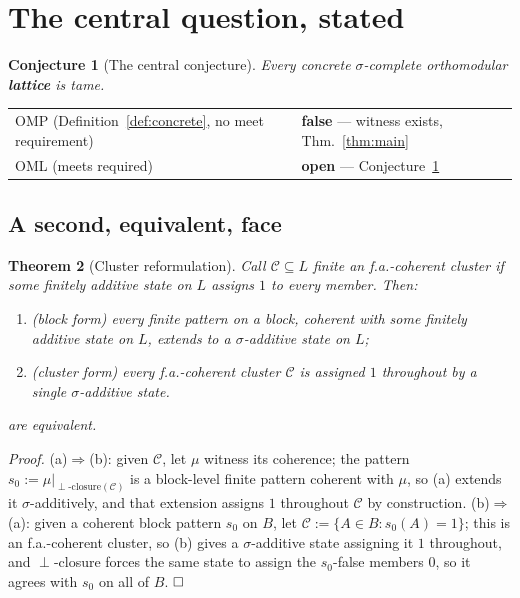 \documentclass[11pt]{article}
\newtheorem{theorem}{Theorem}[section]
\newtheorem{conjecture}[theorem]{Conjecture}
\theoremstyle{remark}
\begin{document}
\section{The central question, stated}

\begin{conjecture}[The central conjecture]
\label{conj:main}
Every concrete $\sigma$-complete orthomodular \textbf{lattice} is tame.
\end{conjecture}

\begin{center}
\begin{tabular}{ll}
\hline
OMP (Definition~\ref{def:concrete}, no meet requirement) & \textbf{false} — witness exists, Thm.~\ref{thm:main}\\
OML (meets required) & \textbf{open} — Conjecture~\ref{conj:main}\\
\hline
\end{tabular}
\end{center}

\subsection{A second, equivalent, face}

\begin{theorem}[Cluster reformulation]
\label{thm:phi-cluster}
Call $\mathcal C\subseteq L$ finite an \emph{f.a.-coherent cluster} if some
finitely additive state on $L$ assigns $1$ to every member. Then:
\begin{enumerate}[label=(\alph*)]
\item (block form) every finite pattern on a block, coherent with some
  finitely additive state on $L$, extends to a $\sigma$-additive state on
  $L$;
\item (cluster form) every f.a.-coherent cluster $\mathcal C$ is assigned $1$
  throughout by a single $\sigma$-additive state.
\end{enumerate}
are equivalent.
\end{theorem}

\emph{Proof.} (a)$\Rightarrow$(b): given $\mathcal C$, let $\mu$ witness its
coherence; the pattern $s_0 := \mu|_{\perp\text{-closure}(\mathcal C)}$ is a
block-level finite pattern coherent with $\mu$, so (a) extends it
$\sigma$-additively, and that extension assigns $1$ throughout $\mathcal C$
by construction. (b)$\Rightarrow$(a): given a coherent block pattern $s_0$ on
$B$, let $\mathcal C := \{A\in B: s_0(A)=1\}$; this is an f.a.-coherent
cluster, so (b) gives a $\sigma$-additive state assigning it $1$ throughout,
and $\perp$-closure forces the same state to assign the $s_0$-false members
$0$, so it agrees with $s_0$ on all of $B$. $\hfill\square$
\end{document}
